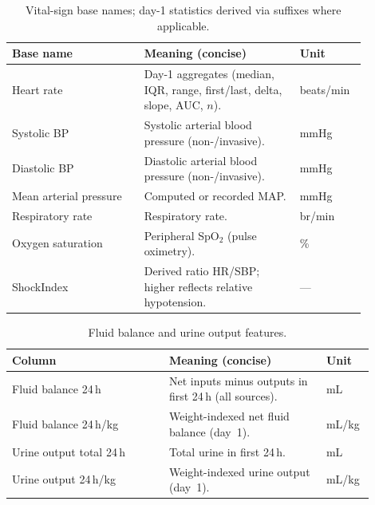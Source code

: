 \vspace{0.75\baselineskip}
\begin{table}[t]\centering
{\small\renewcommand{\arraystretch}{1.12}\setlength{\tabcolsep}{6pt}%
\caption{Vital-sign base names; day-1 statistics derived via suffixes where applicable.}
\label{app:tab-vitals}
\begin{tabular}{P{0.34\linewidth} P{0.40\linewidth} P{0.14\linewidth}}
\toprule
\textbf{Base name} & \textbf{Meaning (concise)} & \textbf{Unit}\\
\midrule
Heart rate & Day-1 aggregates (median, IQR, range, first/last, delta, slope, AUC, $n$). & beats/min\\
Systolic BP & Systolic arterial blood pressure (non-/invasive). & mmHg\\
Diastolic BP & Diastolic arterial blood pressure (non-/invasive). & mmHg\\
Mean arterial pressure & Computed or recorded MAP. & mmHg\\
Respiratory rate & Respiratory rate. & br/min\\
Oxygen saturation & Peripheral SpO$_2$ (pulse oximetry). & \%\\
ShockIndex & Derived ratio HR/SBP; higher reflects relative hypotension. & ---\\
\bottomrule
\end{tabular}}
\end{table}

\vspace{0.75\baselineskip}
\begin{table}[t]\centering
{\small\renewcommand{\arraystretch}{1.12}\setlength{\tabcolsep}{6pt}%
\caption{Fluid balance and urine output features.}
\label{app:tab-fluids-uo}
\begin{tabular}{P{0.40\linewidth} P{0.40\linewidth} P{0.10\linewidth}}
\toprule
\textbf{Column} & \textbf{Meaning (concise)} & \textbf{Unit}\\
\midrule
Fluid balance 24\,h & Net inputs minus outputs in first 24\,h (all sources). & mL\\
Fluid balance 24\,h/kg & Weight-indexed net fluid balance (day~1). & mL/kg\\
Urine output total 24\,h & Total urine in first 24\,h. & mL\\
Urine output 24\,h/kg & Weight-indexed urine output (day~1). & mL/kg\\
\bottomrule
\end{tabular}}
\end{table}


